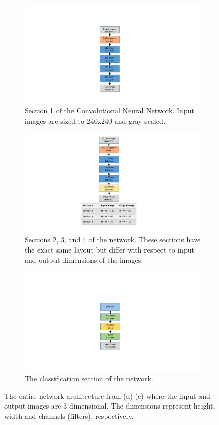 \documentclass{osa-article}
\begin{document}
\begin{figure}
  \begin{subfigure}{0.30\textwidth}
    \centering\includegraphics[width=.48\linewidth]{section1}
    \caption{Section 1 of the Convolutional Neural Network. Input images are sized to 240x240 and gray-scaled.}\label{section1}
  \end{subfigure}\hfill
  \begin{subfigure}{0.30\textwidth}
    \centering
    \includegraphics[width=1.1\linewidth]{section_x}
    \caption{Sections 2, 3, and 4 of the network. These sections have the exact same layout but differ with respect to input and output dimensions of the images.}\label{sec_x}
  \end{subfigure}\hfill
  \begin{subfigure}{0.30\textwidth}
    \centering
    \includegraphics[width=.55\linewidth]{classifying_sec}
    \caption{The classification section of the network.}\label{classifying}
  \end{subfigure}
  \caption{The entire network architecture from (a)-(c) where the input and output images are 3-dimensional. The dimensions represent height, width and channels (filters), respectively.}
\end{figure}
%
\end{document}
